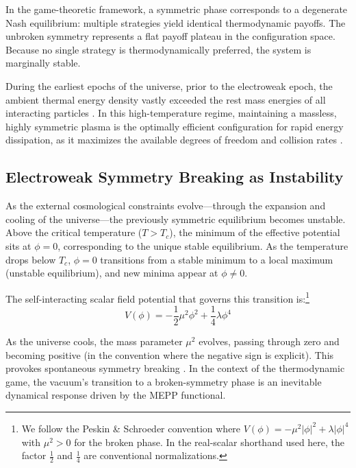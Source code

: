 \documentclass[12pt,a4paper]{article}
\theoremstyle{remark}
\begin{document}
In the game-theoretic framework, a symmetric phase corresponds to a degenerate Nash equilibrium: multiple strategies yield identical thermodynamic payoffs. The unbroken symmetry represents a flat payoff plateau in the configuration space. Because no single strategy is thermodynamically preferred, the system is marginally stable.

During the earliest epochs of the universe, prior to the electroweak epoch, the ambient thermal energy density vastly exceeded the rest mass energies of all interacting particles \citep{HiggsVEV}. In this high-temperature regime, maintaining a massless, highly symmetric plasma is the optimally efficient configuration for rapid energy dissipation, as it maximizes the available degrees of freedom and collision rates \citep{HiggsVEV2024}.

\subsection{Electroweak Symmetry Breaking as Instability}

As the external cosmological constraints evolve---through the expansion and cooling of the universe---the previously symmetric equilibrium becomes unstable. Above the critical temperature ($T > T_c$), the minimum of the effective potential sits at $\phi = 0$, corresponding to the unique stable equilibrium. As the temperature drops below $T_c$, $\phi = 0$ transitions from a stable minimum to a local maximum (unstable equilibrium), and new minima appear at $\phi \neq 0$.

The self-interacting scalar field potential that governs this transition is:\footnote{We follow the Peskin \& Schroeder convention \citep{HiggsVEV} where $V(\phi) = -\mu^2 |\phi|^2 + \lambda |\phi|^4$ with $\mu^2 > 0$ for the broken phase. In the real-scalar shorthand used here, the factor $\frac{1}{2}$ and $\frac{1}{4}$ are conventional normalizations.}
\begin{equation}
V(\phi) = -\frac{1}{2}\mu^2 \phi^2 + \frac{1}{4}\lambda \phi^4
\end{equation}

As the universe cools, the mass parameter $\mu^2$ evolves, passing through zero and becoming positive (in the convention where the negative sign is explicit). This provokes spontaneous symmetry breaking \citep{HiggsVEV2024}. In the context of the thermodynamic game, the vacuum's transition to a broken-symmetry phase is an inevitable dynamical response driven by the MEPP functional.
\end{document}
